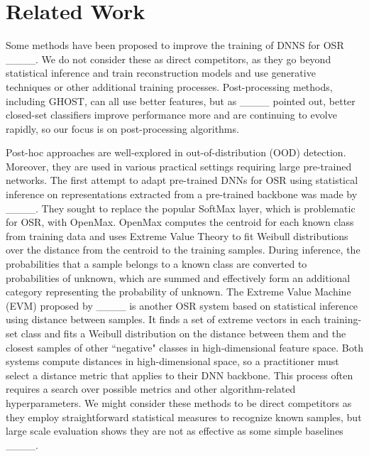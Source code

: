 \section{Related Work}
\label{sec:related}

Some methods have been proposed to improve the training of DNNS for OSR ____.
We do not consider these as direct competitors, as they go beyond statistical inference and train reconstruction models and use generative techniques or other additional training processes.  
Post-processing methods, including GHOST, can all use better features, but as ____ pointed out, better closed-set classifiers improve performance more and are continuing to evolve rapidly, so our focus is on post-processing algorithms.   

Post-hoc approaches are well-explored in out-of-distribution (OOD) detection. 
Moreover, they are used in various practical settings requiring large pre-trained networks. 
The first attempt to adapt pre-trained DNNs for OSR using statistical inference on representations extracted from a pre-trained backbone was made by ____.
They sought to replace the popular SoftMax layer, which is problematic for OSR, with OpenMax.
OpenMax computes the centroid for each known class from training data and uses Extreme Value Theory to fit Weibull distributions over the distance from the centroid to the training samples.
During inference, the probabilities that a sample belongs to a known class are converted to probabilities of unknown, which are summed and effectively form an additional category representing the probability of unknown.
The Extreme Value Machine (EVM) proposed by ____ is another OSR system based on statistical inference using distance between samples. 
It finds a set of extreme vectors in each training-set class and fits a Weibull distribution on the distance between them and the closest samples of other ``negative" classes in high-dimensional feature space.
Both systems compute distances in high-dimensional space, so a practitioner must select a distance metric that applies to their DNN backbone. 
This process often requires a search over possible metrics and other algorithm-related hyperparameters.
We might consider these methods to be direct competitors as they employ straightforward statistical measures to recognize known samples, but large scale evaluation shows they are not as effective as some simple baselines ____. 

